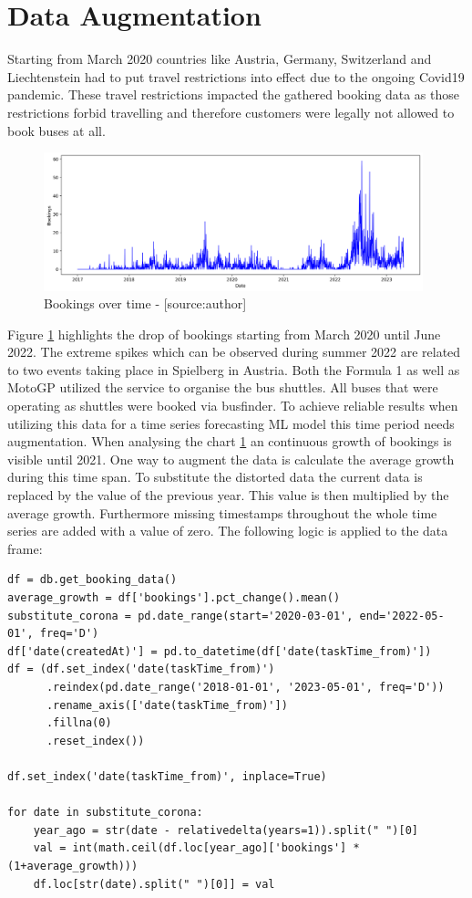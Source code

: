 \section{Data Augmentation}
\label{sec:data_aug}
Starting from March 2020 countries like Austria, Germany, Switzerland and Liechtenstein had to put travel restrictions into effect due to the ongoing Covid19 pandemic. These travel restrictions impacted the gathered booking data as those restrictions forbid travelling and therefore customers were legally not allowed to book buses at all.
\begin{figure}[H]
	\centering
		\includegraphics[width=11cm]{images/no_augmentation}
	\caption{Bookings over time - [source:author]}
	\label{fig:noAug}
\end{figure}
Figure \ref{fig:noAug} highlights the drop of bookings starting from March 2020 until June 2022. The extreme spikes which can be observed during summer 2022 are related to two events taking place in Spielberg in Austria. Both the Formula 1 as well as MotoGP utilized the service to organise the bus shuttles. All buses that were operating as shuttles were booked via busfinder.  To achieve reliable results when utilizing this data for a time series forecasting ML model this time period needs augmentation. When analysing the chart \ref{fig:noAug} an continuous growth of bookings is visible until 2021. One way to augment the data \cite{data_aug} is calculate the average growth during this time span. To substitute the distorted data the current data is replaced by the value of the previous year. This value is then multiplied by the average growth. Furthermore missing timestamps throughout the whole time series are added with a value of zero. The following logic is applied to the data frame: 

\begin{lstlisting}
df = db.get_booking_data()
average_growth = df['bookings'].pct_change().mean()
substitute_corona = pd.date_range(start='2020-03-01', end='2022-05-01', freq='D')
df['date(createdAt)'] = pd.to_datetime(df['date(taskTime_from)'])
df = (df.set_index('date(taskTime_from)')
      .reindex(pd.date_range('2018-01-01', '2023-05-01', freq='D'))
      .rename_axis(['date(taskTime_from)'])
      .fillna(0)
      .reset_index())

df.set_index('date(taskTime_from)', inplace=True)

for date in substitute_corona:
    year_ago = str(date - relativedelta(years=1)).split(" ")[0]
    val = int(math.ceil(df.loc[year_ago]['bookings'] * (1+average_growth)))
    df.loc[str(date).split(" ")[0]] = val
\end{lstlisting}

